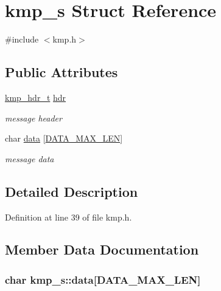 \hypertarget{structkmp__s}{\section{kmp\-\_\-s Struct Reference}
\label{structkmp__s}
}


{\ttfamily \#include $<$kmp.\-h$>$}

\subsection*{Public Attributes}
\begin{DoxyCompactItemize}
\item 
\hyperlink{structkmp__hdr__t}{kmp\-\_\-hdr\-\_\-t} \hyperlink{structkmp__s_a0f268cce5b65a4d47596f9a849332dae}{hdr}
\begin{DoxyCompactList}\small\item\em message header \end{DoxyCompactList}\item 
char \hyperlink{structkmp__s_ae80a2e602a7403e0d168249f5206bf16}{data} \mbox{[}\hyperlink{kmp_8h_ab377b2c7e1ef521373a74f4200644495}{D\-A\-T\-A\-\_\-\-M\-A\-X\-\_\-\-L\-E\-N}\mbox{]}
\begin{DoxyCompactList}\small\item\em message data \end{DoxyCompactList}\end{DoxyCompactItemize}


\subsection{Detailed Description}


Definition at line 39 of file kmp.\-h.



\subsection{Member Data Documentation}
\hypertarget{structkmp__s_ae80a2e602a7403e0d168249f5206bf16}{
\subsubsection[{data}]{\setlength{\rightskip}{0pt plus 5cm}char kmp\-\_\-s\-::data\mbox{[}{\bf D\-A\-T\-A\-\_\-\-M\-A\-X\-\_\-\-L\-E\-N}\mbox{]}}}\label{structkmp__s_ae80a2e602a7403e0d168249f5206bf16}


